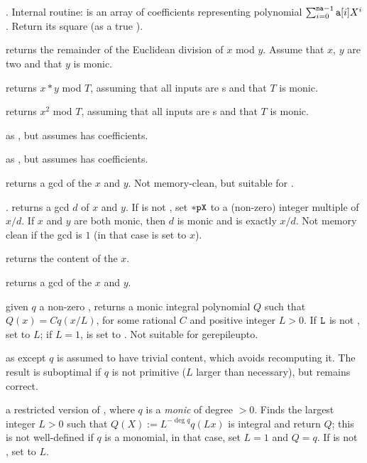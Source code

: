 . Internal routine:
 is an array of coefficients representing polynomial
$\sum_{i = 0}^{{\tt na-1}} {\tt a}[i] X^i$. Return its square (as a true
).

 returns the remainder of the Euclidean
division of $x$ mod $y$. Assume that $x$, $y$ are two  and that
$y$ is monic.

 returns $x*y$ mod $T$, assuming
that all inputs are s and that $T$ is monic.

 returns $x^2$ mod $T$, assuming
that all inputs are s and that $T$ is monic.

 as , but assumes
 has  coefficients.

 as , but assumes  has 
coefficients.

 returns a gcd of the  $x$ and $y$.
Not memory-clean, but suitable for .

. returns a gcd $d$ of $x$ and
$y$. If  is not , set ${\tt *pX}$ to a (non-zero) integer
multiple of $x/d$. If $x$ and $y$ are both monic, then $d$ is monic and
 is exactly $x/d$. Not memory clean if the gcd is $1$
(in that case  is set to $x$).

 returns the content of the  $x$.

 returns a gcd of the  $x$ and $y$.

 given $q$ a non-zero ,
returns a monic integral polynomial $Q$ such that $Q(x) = C q(x/L)$, for some
rational $C$ and positive integer $L > 0$. If ${\tt L}$ is not ,
set  to $L$; if $L = 1$,  is set to . Not
suitable for gerepileupto.

 as  except
$q$ is assumed to have trivial content, which avoids recomputing it.
The result is suboptimal if $q$ is not primitive ($L$ larger than
necessary), but remains correct.

 a restricted version of
, where $q$ is a \emph{monic} 
of degree $> 0$. Finds the largest integer $L > 0$ such that
$Q(X) := L^{-\deg q} q(Lx)$ is integral and return $Q$; this is not
well-defined if $q$ is a monomial, in that case, set $L=1$ and $Q = q$. If
 is not , set  to $L$.


